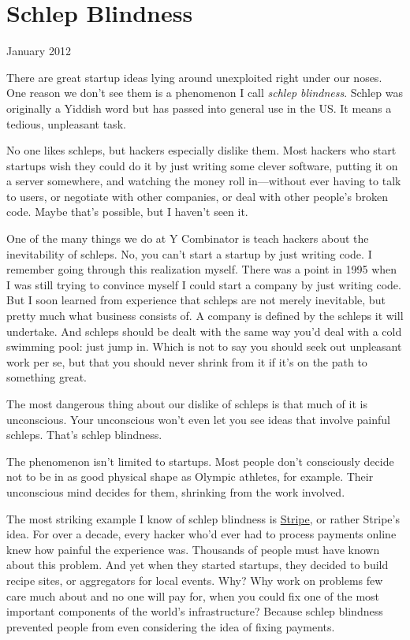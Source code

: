 \chapter{Schlep Blindness}

January 2012

There are great startup ideas lying around unexploited right under our
noses. One reason we don't see them is a phenomenon I call \emph{schlep
blindness}. Schlep was originally a Yiddish word but has passed into
general use in the US. It means a tedious, unpleasant task.

No one likes schleps, but hackers especially dislike them. Most hackers
who start startups wish they could do it by just writing some clever
software, putting it on a server somewhere, and watching the money roll
in---without ever having to talk to users, or negotiate with other
companies, or deal with other people's broken code. Maybe that's
possible, but I haven't seen it.

One of the many things we do at Y Combinator is teach hackers about the
inevitability of schleps. No, you can't start a startup by just writing
code. I remember going through this realization myself. There was a
point in 1995 when I was still trying to convince myself I could start a
company by just writing code. But I soon learned from experience that
schleps are not merely inevitable, but pretty much what business
consists of. A company is defined by the schleps it will undertake. And
schleps should be dealt with the same way you'd deal with a cold
swimming pool: just jump in. Which is not to say you should seek out
unpleasant work per se, but that you should never shrink from it if it's
on the path to something great.

The most dangerous thing about our dislike of schleps is that much of it
is unconscious. Your unconscious won't even let you see ideas that
involve painful schleps. That's schlep blindness.

The phenomenon isn't limited to startups. Most people don't consciously
decide not to be in as good physical shape as Olympic athletes, for
example. Their unconscious mind decides for them, shrinking from the
work involved.

The most striking example I know of schlep blindness is
\href{http://stripe.com}{Stripe}, or rather Stripe's idea. For over a
decade, every hacker who'd ever had to process payments online knew how
painful the experience was. Thousands of people must have known about
this problem. And yet when they started startups, they decided to build
recipe sites, or aggregators for local events. Why? Why work on problems
few care much about and no one will pay for, when you could fix one of
the most important components of the world's infrastructure? Because
schlep blindness prevented people from even considering the idea of
fixing payments.

